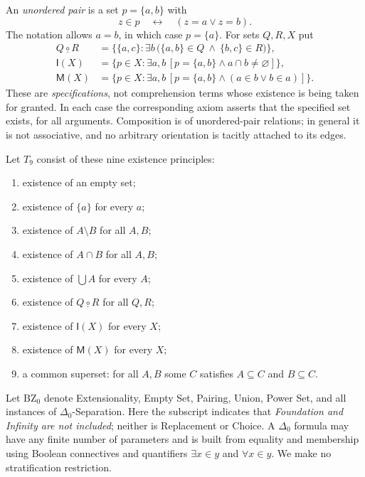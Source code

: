 \documentclass[11pt,a4paper]{article}
\numberwithin{equation}{section}
\newcommand{\up}[2]{\{#1,#2\}}
\newcommand{\Comp}{\mathbin{\underline{\circ}}}
\newcommand{\Int}{\mathsf{I}}
\newcommand{\Mem}{\mathsf{M}}
\newcommand{\Dzero}{\Delta_0}
\newcommand{\Tnine}{T_9}
\begin{document}
An \emph{unordered pair} is a set $p=\up ab$ with
\[
 z\in p\quad\longleftrightarrow\quad(z=a\lor z=b).
\]
The notation allows $a=b$, in which case $p=\{a\}$.  For sets $Q,R,X$ put
\begin{align}
Q\Comp R&=\bigl\{\up ac:\exists b\,\bigl(\up ab\in Q\ \wedge\ \up bc\in R\bigr)\bigr\},\label{eq:comp}\\
\Int(X)&=\bigl\{p\in X:\exists a,b\,[p=\up ab\land a\cap b\ne\varnothing]\bigr\},\label{eq:int}\\
\Mem(X)&=\bigl\{p\in X:\exists a,b\,[p=\up ab\land(a\in b\lor b\in a)]\bigr\}.\label{eq:mem}
\end{align}
These are \emph{specifications}, not comprehension terms whose existence is being taken for granted.  In each case the corresponding axiom asserts that the specified set exists, for all arguments.  Composition is of unordered-pair relations; in general it is not associative, and no arbitrary orientation is tacitly attached to its edges.

Let $\Tnine$ consist of these nine existence principles:
\begin{enumerate}[label=(\arabic*),leftmargin=2.3em,itemsep=2pt]
\item existence of an empty set;
\item existence of $\{a\}$ for every $a$;
\item existence of $A\setminus B$ for all $A,B$;
\item existence of $A\cap B$ for all $A,B$;
\item existence of $\bigcup A$ for every $A$;
\item existence of $Q\Comp R$ for all $Q,R$;
\item existence of $\Int(X)$ for every $X$;
\item existence of $\Mem(X)$ for every $X$;
\item a common superset: for all $A,B$ some $C$ satisfies $A\subseteq C$ and $B\subseteq C$.
\end{enumerate}
Let $\mathrm{BZ}_0$ denote Extensionality, Empty Set, Pairing, Union, Power Set, and all instances of $\Dzero$-Separation.  Here the subscript indicates that \emph{Foundation and Infinity are not included}; neither is Replacement or Choice.  A $\Dzero$ formula may have any finite number of parameters and is built from equality and membership using Boolean connectives and quantifiers $\exists x\in y$ and $\forall x\in y$.  We make no stratification restriction.
\end{document}
